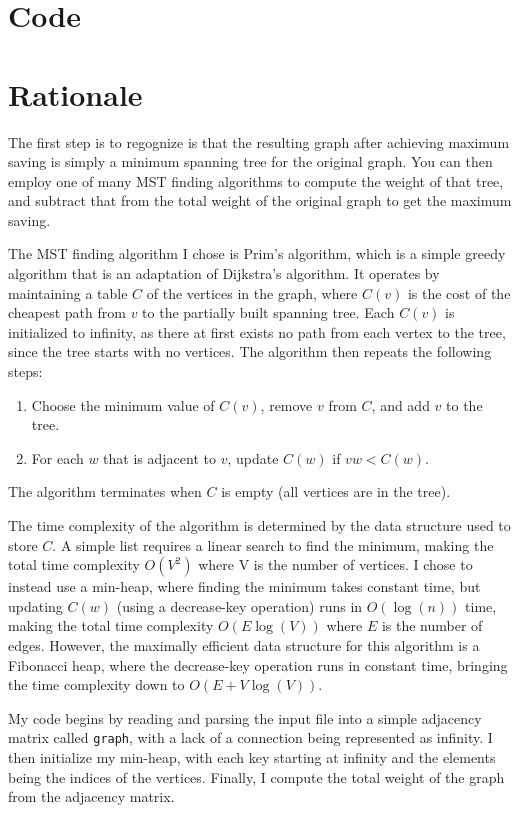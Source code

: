 \documentclass[11pt]{article}
\begin{document}
\section{Code}


\section{Rationale}
The first step is to regognize is that the resulting graph after achieving maximum saving is simply a minimum spanning tree for the original graph. You can then employ one of many MST finding algorithms to compute the weight of that tree, and subtract that from the total weight of the original graph to get the maximum saving.

The MST finding algorithm I chose is Prim's algorithm, which is a simple greedy algorithm that is an adaptation of Dijkstra's algorithm. It operates by maintaining a table $C$ of the vertices in the graph, where $C(v)$ is the cost of the cheapest path from $v$ to the partially built spanning tree. Each $C(v)$ is initialized to infinity, as there at first exists no path from each vertex to the tree, since the tree starts with no vertices. The algorithm then repeats the following steps:

\begin{enumerate}
	\item Choose the minimum value of $C(v)$, remove $v$ from $C$, and add $v$ to the tree.
	\item For each $w$ that is adjacent to $v$, update $C(w)$ if $vw < C(w)$.
\end{enumerate}

The algorithm terminates when $C$ is empty (all vertices are in the tree).

The time complexity of the algorithm is determined by the data structure used to store $C$. A simple list requires a linear search to find the minimum, making the total time complexity $O(V^2)$ where V is the number of vertices. I chose to instead use a min-heap, where finding the minimum takes constant time, but updating $C(w)$ (using a decrease-key operation) runs in $O(\log(n))$ time, making the total time complexity $O(E \log(V))$ where $E$ is the number of edges. However, the maximally efficient data structure for this algorithm is a Fibonacci heap, where the decrease-key operation runs in constant time, bringing the time complexity down to $O(E + V \log(V))$.

My code begins by reading and parsing the input file into a simple adjacency matrix called \verb!graph!, with a lack of a connection being represented as infinity. I then initialize my min-heap, with each key starting at infinity and the elements being the indices of the vertices. Finally, I compute the total weight of the graph from the adjacency matrix.
\end{document}
